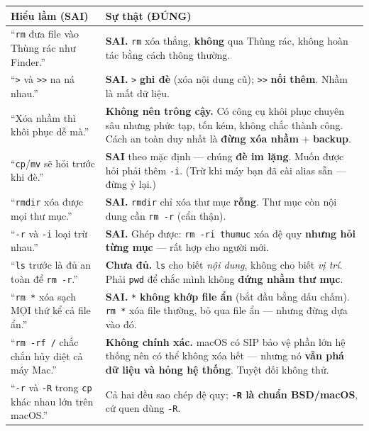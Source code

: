 \documentclass[12pt,a4paper]{article}
\newcommand{\cmd}[1]{\texttt{#1}}
\begin{document}
\renewcommand{\arraystretch}{1.35}
\begin{longtable}{>{\raggedright\arraybackslash}p{6cm} >{\raggedright\arraybackslash}p{8.5cm}}
\rowcolor{seniorbluebg}
\textbf{Hiểu lầm (SAI)} & \textbf{Sự thật (ĐÚNG)} \\
\hline
\endhead
``\cmd{rm} đưa file vào Thùng rác như Finder.'' & \textbf{SAI.} \cmd{rm} xóa thẳng, \textbf{không} qua Thùng rác, không hoàn tác bằng cách thông thường. \\
``\cmd{>} và \cmd{>>} na ná nhau.'' & \textbf{SAI.} \cmd{>} \textbf{ghi đè} (xóa nội dung cũ); \cmd{>>} \textbf{nối thêm}. Nhầm là mất dữ liệu. \\
``Xóa nhầm thì khôi phục dễ mà.'' & \textbf{Không nên trông cậy.} Có công cụ khôi phục chuyên sâu nhưng phức tạp, tốn kém, không chắc thành công. Cách an toàn duy nhất là \textbf{đừng xóa nhầm} + \textbf{backup}. \\
``\cmd{cp}/\cmd{mv} sẽ hỏi trước khi đè.'' & \textbf{SAI} theo mặc định --- chúng \textbf{đè im lặng}. Muốn được hỏi phải thêm \cmd{-i}. (Trừ khi máy bạn đã cài alias sẵn --- đừng ỷ lại.) \\
``\cmd{rmdir} xóa được mọi thư mục.'' & \textbf{SAI.} \cmd{rmdir} chỉ xóa thư mục \textbf{rỗng}. Thư mục còn nội dung cần \cmd{rm -r} (cẩn thận). \\
``\cmd{-r} và \cmd{-i} loại trừ nhau.'' & \textbf{SAI.} Ghép được: \cmd{rm -ri thumuc} xóa đệ quy \textbf{nhưng hỏi từng mục} --- rất hợp cho người mới. \\
``\cmd{ls} trước là đủ an toàn để \cmd{rm -r}.'' & \textbf{Chưa đủ.} \cmd{ls} cho biết \textit{nội dung}, không cho biết \textit{vị trí}. Phải \cmd{pwd} để chắc mình không \textbf{đứng nhầm thư mục}. \\
``\cmd{rm *} xóa sạch MỌI thứ kể cả file ẩn.'' & \textbf{SAI.} \cmd{*} \textbf{không khớp file ẩn} (bắt đầu bằng dấu chấm). \cmd{rm *} xóa file thường, bỏ qua file ẩn --- nhưng đừng dựa vào đó. \\
``\cmd{rm -rf /} chắc chắn hủy diệt cả máy Mac.'' & \textbf{Không chính xác.} macOS có SIP bảo vệ phần lớn hệ thống nên có thể không xóa hết --- nhưng nó \textbf{vẫn phá dữ liệu và hỏng hệ thống}. Tuyệt đối không thử. \\
``\cmd{-r} và \cmd{-R} trong \cmd{cp} khác nhau lớn trên macOS.'' & Cả hai đều sao chép đệ quy; \textbf{\cmd{-R} là chuẩn BSD/macOS}, cứ quen dùng \cmd{-R}. \\
\end{longtable}

\end{document}
